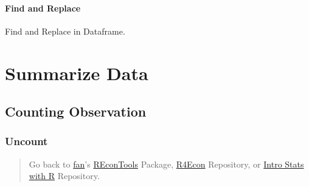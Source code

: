 \documentclass[
]{book}
\newenvironment{Shaded}{\begin{snugshade}}{\end{snugshade}}
\newcommand{\CommentTok}[1]{\textcolor[rgb]{0.56,0.35,0.01}{\textit{#1}}}
\newcommand{\KeywordTok}[1]{\textcolor[rgb]{0.13,0.29,0.53}{\textbf{#1}}}
\newcommand{\NormalTok}[1]{#1}
\newcommand{\OperatorTok}[1]{\textcolor[rgb]{0.81,0.36,0.00}{\textbf{#1}}}
\newcommand{\StringTok}[1]{\textcolor[rgb]{0.31,0.60,0.02}{#1}}
\begin{document}
\hypertarget{find-and-replace-1}{%
\subsubsection{Find and Replace}\label{find-and-replace-1}}

Find and Replace in Dataframe.

\begin{Shaded}
\end{Shaded}

\hypertarget{summarize-data}{%
\chapter{Summarize Data}\label{summarize-data}}

\hypertarget{counting-observation}{%
\section{Counting Observation}\label{counting-observation}}

\hypertarget{uncount}{%
\subsection{Uncount}\label{uncount}}

\begin{quote}
Go back to \href{http://fanwangecon.github.io/CodeDynaAsset/}{fan}'s \href{https://fanwangecon.github.io/REconTools/}{REconTools} Package, \href{https://fanwangecon.github.io/R4Econ/}{R4Econ} Repository, or \href{https://fanwangecon.github.io/Stat4Econ/}{Intro Stats with R} Repository.
\end{quote}
\end{document}
